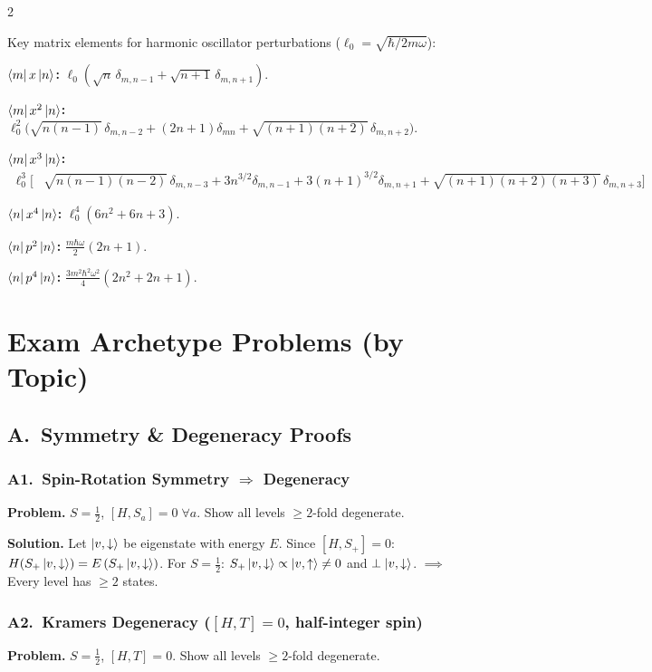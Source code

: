 \documentclass[9pt,a4paper]{article} %
\begin{document}
\begin{multicols}{2}
{\scriptsize
Key matrix elements for harmonic oscillator perturbations ($\ell_0 = \sqrt{\hbar/2m\omega}$):

\textbf{$\bra{m}x\ket{n}$:} $\ell_0(\sqrt{n}\,\delta_{m,n-1} + \sqrt{n+1}\,\delta_{m,n+1})$.

\textbf{$\bra{m}x^2\ket{n}$:} $\ell_0^2\bigl(\sqrt{n(n-1)}\,\delta_{m,n-2} + (2n+1)\delta_{mn} + \sqrt{(n+1)(n+2)}\,\delta_{m,n+2}\bigr)$.

\textbf{$\bra{m}x^3\ket{n}$:}
\begin{align*}
\ell_0^3\bigl[&\sqrt{n(n-1)(n-2)}\,\delta_{m,n-3}+3n^{3/2}\delta_{m,n-1} 
+3(n+1)^{3/2}\delta_{m,n+1}+\sqrt{(n+1)(n+2)(n+3)}\,\delta_{m,n+3}\bigr]
\end{align*}

\textbf{$\bra{n}x^4\ket{n}$:} $\ell_0^4(6n^2+6n+3)$.

\textbf{$\bra{n}p^2\ket{n}$:} $\frac{m\hbar\omega}{2}(2n+1)$.

\textbf{$\bra{n}p^4\ket{n}$:} $\frac{3m^2\hbar^2\omega^2}{4}(2n^2+2n+1)$.
}
\section{Exam Archetype Problems (by Topic)}

\subsection{A.\ Symmetry \& Degeneracy Proofs}

\subsubsection{A1.\ Spin-Rotation Symmetry $\Rightarrow$ Degeneracy}
\textbf{Problem.} $S=\tfrac{1}{2}$, $[H,S_a]=0\;\forall a$. Show all levels $\ge 2$-fold degenerate.

\textbf{Solution.}
Let $\ket{v,\downarrow}$ be eigenstate with energy $E$. Since $[H,S_+]=0$:
$H(S_+\ket{v,\downarrow})=E\,(S_+\ket{v,\downarrow})$.
For $S=\tfrac{1}{2}$: $S_+\ket{v,\downarrow}\propto\ket{v,\uparrow}\ne 0$ and $\perp\ket{v,\downarrow}$.
$\implies$ Every level has $\ge 2$ states. \checkmark

\subsubsection{A2.\ Kramers Degeneracy ($[H,T]=0$, half-integer spin)}
\textbf{Problem.} $S=\tfrac{1}{2}$, $[H,T]=0$. Show all levels $\ge 2$-fold degenerate.


\end{multicols}
\end{document}
